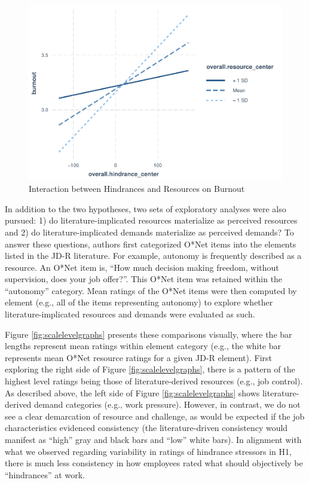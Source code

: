 \documentclass[
  man,mask]{apa7}
\begin{document}
\begin{figure}
\centering
\includegraphics{Submission_files/figure-latex/hind-resource-burn-int-1.pdf}
\caption{\label{fig:hind-resource-burn-int}Interaction between Hindrances and Resources on Burnout}
\end{figure}

In addition to the two hypotheses, two sets of exploratory analyses were also pursued: 1) do literature-implicated resources materialize as perceived resources and 2) do literature-implicated demands materialize as perceived demands? To answer these questions, authors first categorized O*Net items into the elements listed in the JD-R literature. For example, autonomy is frequently described as a resource. An O*Net item is, ``How much decision making freedom, without supervision, does your job offer?''. This O*Net item was retained within the ``autonomy'' category. Mean ratings of the O*Net items were then computed by element (e.g., all of the items representing autonomy) to explore whether literature-implicated resources and demands were evaluated as such.

Figure \ref{fig:scalelevelgraphs} presents these comparisons visually, where the bar lengths represent mean ratings within element category (e.g., the white bar represents mean O*Net resource ratings for a given JD-R element). First exploring the right side of Figure \ref{fig:scalelevelgraphs}, there is a pattern of the highest level ratings being those of literature-derived resources (e.g., job control). As described above, the left side of Figure \ref{fig:scalelevelgraphs} shows literature-derived demand categories (e.g., work pressure). However, in contrast, we do not see a clear demarcation of resource and challenge, as would be expected if the job characteristics evidenced consistency (the literature-driven consistency would manifest as ``high'' gray and black bars and ``low'' white bars). In alignment with what we observed regarding variability in ratings of hindrance stressors in H1, there is much less consistency in how employees rated what should objectively be ``hindrances'' at work.
\end{document}
